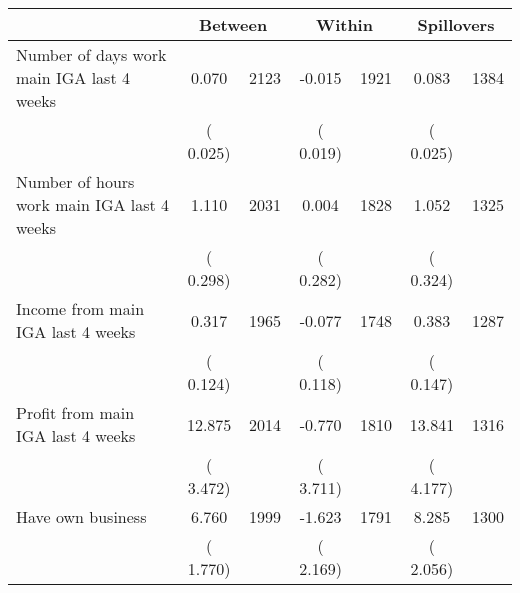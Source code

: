 \begin{tabular}{l*{6}{c}}\hline&\multicolumn{2}{c}{Between}&\multicolumn{2}{c}{Within}&\multicolumn{2}{c}{Spillovers} \\  \hline
Number of days work main IGA last 4 weeks        &              0.070         &       2123       &             -0.015      &       1921       &              0.083         &       1384       \\
                       &       (       0.025)            &                               &       (       0.019)            &                               &       (       0.025)            &                               \\
Number of hours work main IGA last 4 weeks        &              1.110         &       2031       &              0.004      &       1828       &              1.052         &       1325       \\
                       &       (       0.298)            &                               &       (       0.282)            &                               &       (       0.324)            &                               \\
Income from main IGA last 4 weeks        &              0.317        &       1965       &             -0.077      &       1748       &              0.383         &       1287       \\
                       &       (       0.124)            &                               &       (       0.118)            &                               &       (       0.147)            &                               \\
Profit from main IGA last 4 weeks        &             12.875         &       2014       &             -0.770      &       1810       &             13.841         &       1316       \\
                       &       (       3.472)            &                               &       (       3.711)            &                               &       (       4.177)            &                               \\
Have own business        &              6.760         &       1999       &             -1.623      &       1791       &              8.285         &       1300       \\
                       &       (       1.770)            &                               &       (       2.169)            &                               &       (       2.056)            &                               \\

\end{tabular}

